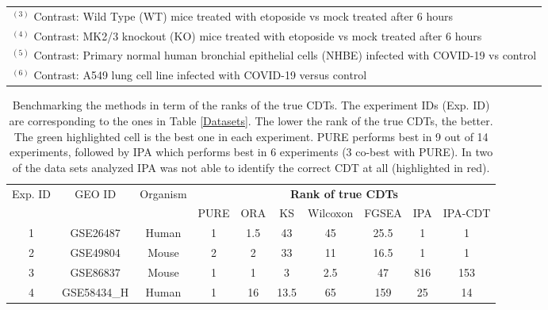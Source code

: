 \begin{table}
\begin{center}
\begin{tabular}{ c|cccc }
 \multicolumn{5}{l}{\tiny $^{(3)}$ Contrast: Wild Type (WT) mice treated with etoposide vs mock treated after 6 hours}\\
 \multicolumn{5}{l}{\tiny $^{(4)}$ Contrast: MK2/3 knockout (KO) mice treated with etoposide vs mock treated after 6 hours}\\
 \multicolumn{5}{l}{\tiny $^{(5)}$ Contrast: Primary normal human bronchial epithelial cells (NHBE) infected with COVID-19 vs control}\\
 \multicolumn{5}{l}{\tiny $^{(6)}$ Contrast: A549 lung cell line infected with COVID-19 versus control}\\
\end{tabular}
\end{center}
\end{table}


\begin{table}
\caption{\label{Ranks} Benchmarking the methods in term of the ranks of the true CDTs. The experiment IDs (Exp. ID) are corresponding to the ones in Table \ref{Datasets}. The lower the rank of the true CDTs, the better.  The green highlighted cell is the best one in each experiment. PURE performs best in 9 out of 14 experiments, followed by IPA which performs best in 6 experiments (3 co-best with PURE). In two of the data sets analyzed IPA was not able to identify the correct CDT at all  (highlighted in red).}
\begin{center}
\scriptsize
\begin{tabular}{ ccc|ccccccc } 

 \hline \hline

\multirow{2}{*}{Exp. ID}& \multirow{2}{*}{GEO ID}& \multirow{2}{*}{Organism} & \multicolumn{7}{c}{\textbf{Rank of true CDTs}} \\
&  && PURE  & ORA & KS  & Wilcoxon & FGSEA & IPA& IPA-CDT\\
\hline
1	& GSE26487& Human &	\cellcolor{green}1	&	1.5	&	43	&	45	&	25.5	& \cellcolor{green}1&	\cellcolor{green}1\\ 

2	& GSE49804& Mouse	&	2	&	2	&	33	&	11	&	16.5	&	\cellcolor{green}1 & \cellcolor{green}1\\ 

3	& GSE86837& Mouse	&	\cellcolor{green}1	&	\cellcolor{green}1	&	3	&	2.5	&	47	&	816& 153\\ 

4	& GSE58434\_H& Human &	\cellcolor{green}1	&	16	&	13.5	&	65	&	159	&	25 & 14\\ 


\end{tabular}
\end{center}
\end{table}
